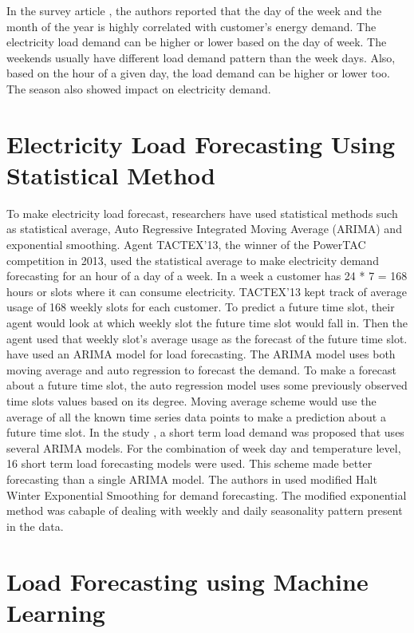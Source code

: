 In the survey article \cite{hahn2009electric}, the authors reported that the day of the week and the month of the year is highly correlated with customer's energy demand. The electricity load demand can be higher or lower based on the day of week. The weekends usually have different load demand pattern than the week days. Also, based on the hour of a given day, the load demand can be higher or lower too. The season also showed impact on electricity demand. 

\section{Electricity Load Forecasting Using Statistical Method}

To make electricity load forecast, researchers have used statistical methods such as statistical average, Auto Regressive Integrated Moving Average (ARIMA) and exponential smoothing.  Agent TACTEX'13, the winner of the PowerTAC competition in 2013, used the statistical average to make electricity demand forecasting for an hour of a day of a week. In a week a customer has 24 * 7 = 168 hours or slots where it can consume electricity. TACTEX'13  kept track of average usage of 168 weekly slots for each customer. To predict a future time slot, their agent would look at which weekly slot the future time slot would fall in. Then the agent used that weekly slot's average usage as the forecast of the future time slot. \cite{cho1995customer} have used an ARIMA model for load forecasting. The ARIMA model uses both moving average and auto regression to forecast the demand. To make a forecast about a future time slot, the auto regression model uses some previously observed time slots values based on its degree. Moving average scheme would use the average of all the known time series data points to make a prediction about a future time slot. In the study \cite{amjady2001short}, a short term load demand was proposed that uses several ARIMA models. For the combination of week day and temperature level, 16 short term load forecasting models were used. This scheme made better forecasting than a single ARIMA model. The authors in \cite{jalil2013electricity} used modified Halt Winter Exponential Smoothing for demand forecasting. The modified exponential method was cabaple of dealing with weekly and daily seasonality pattern present in the data.    


\section{Load Forecasting using Machine Learning}

